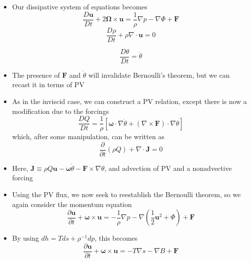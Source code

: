 \documentclass[30pt,landscape]{foils}
\newcommand{\pdiff}[2]{\frac{\partial #1}{\partial #2}}
\begin{document}
\hypersetup{pdfpagetransition=Replace}

\begin{itemize}

  \item Our dissipative system of equations becomes
  \begin{equation*}
  \frac{D \bm{u}}{D t} + 2\bm{\Omega} \times \bm{u} = \frac{1}{\rho} \nabla p - \nabla \Phi + \bm{F}
  \end{equation*}
  \begin{equation*}
  \frac{D \rho}{D t} + \rho \nabla \cdot \bm{u} = 0
  \end{equation*}

  \begin{equation*}
  \frac{D \theta}{D t} = \dot{\theta}
  \end{equation*}

  \item The presence of $\bm{F}$ and $\dot{\theta}$ will invalidate Bernoulli's theorem, but we can recast it in terms of PV

  \item As in the inviscid case, we can construct a PV relation, except there is now a modification due to the forcings
  \begin{equation*}
  \frac{D Q}{D t} = \frac{1}{\rho} \left[ \bm{\omega} \cdot \nabla \dot{\theta} + \left(\nabla \times \bm{F}\right) \cdot \nabla \theta \right]
  \end{equation*}
  which, after some manipulation, can be written as
  \begin{equation*}
  \pdiff{}{t}\left(\rho Q\right) + \nabla \cdot \bm{J} = 0
  \end{equation*}

  \item Here, $\bm{J} \equiv \rho Q \bm{u} - \bm{\omega} \dot{\theta} - \bm{F} \times \nabla \theta$, and advection of PV and a nonadvective forcing

  \item Using the PV flux, we now seek to reestablish the Bernoulli theorem, so we again consider the momentum equation
  \begin{equation*}
  \pdiff{\bm{u}}{t} + \bm{\omega} \times \bm{u} = -\frac{1}{\rho} \nabla p - \nabla \left(\frac{1}{2} \bm{u}^2 + \Phi\right) + \bm{F}
  \end{equation*}

  \item By using $dh = T ds + \rho^{-1} dp$, this becomes
  \begin{equation*}
  \pdiff{\bm{u}}{t} + \bm{\omega} \times \bm{u} = -T \nabla s - \nabla B + \bm{F}
  \end{equation*}


\end{itemize}
\end{document}
